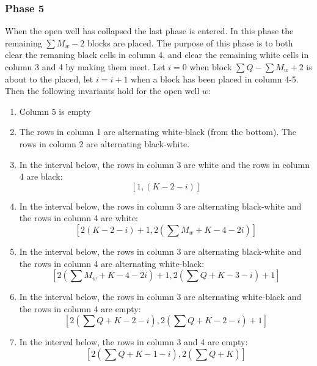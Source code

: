 \subsubsection{Phase 5}
When the open well has collapsed the last phase is entered. In this phase the remaining $\sum M_w - 2$ blocks are placed. The purpose of this phase is to both clear the remaning black cells in column 4, and clear the remaining white cells in column 3 and 4 by making them meet. Let $i = 0$ when block $\sum Q -  \sum M_w + 2$ is about to the placed, let $i = i +1$ when a block has been placed in column 4-5. Then the following invariants hold for the open well $w$:

\begin{enumerate}
\item Column 5 is empty
\item The rows in column 1 are alternating white-black (from the bottom). The rows in column 2 are alternating black-white.
\item In the interval below, the rows in column 3 are white and the rows in column 4 are black:
\begin{equation*}
    \left[1, \left( K - 2 -i \right)\right]
\end{equation*}
\item In the interval below, the rows in column 3 are alternating black-white and the rows in column 4 are white:
\begin{equation*}
    \left[2 \left( K-2-i\right) +1, 2 \left(\sum M_w + K -4 -2i \right)\right]
\end{equation*}
\item In the interval below, the rows in column 3 are alternating black-white and the rows in column 4 are alternating white-black:
\begin{equation*}
    \left[ 2 \left(\sum M_w + K -4 -2i \right) +1, 2 \left( \sum Q + K - 3 -i\right) + 1 \right]
\end{equation*}
\item In the interval below, the rows in column 3 are alternating white-black and the rows in column 4 are empty:
\begin{equation*}
    \left[ 2 \left( \sum Q + K - 2 -i\right), 2 \left( \sum Q + K - 2 -i \right)+1 \right]
\end{equation*}
\item In the interval below, the rows in column 3 and 4 are empty:
\begin{equation*}
    \left[ 2 \left( \sum Q + K - 1 -i\right), 2 \left( \sum Q + K \right) \right]
\end{equation*}

\end{enumerate}

